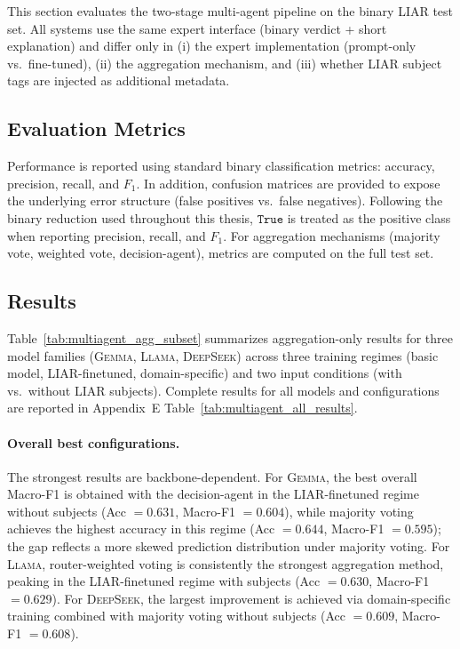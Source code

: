 This section evaluates the two-stage multi-agent pipeline on the binary LIAR test set.
All systems use the same expert interface (binary verdict + short explanation) and differ only in (i) the expert implementation (prompt-only vs.\ fine-tuned), (ii) the aggregation mechanism, and (iii) whether LIAR subject tags are injected as additional metadata.

\subsection{Evaluation Metrics}

Performance is reported using standard binary classification metrics: accuracy, precision, recall, and $F_1$.
In addition, confusion matrices are provided to expose the underlying error structure (false positives vs.\ false negatives).
Following the binary reduction used throughout this thesis, $\texttt{True}$ is treated as the positive class when reporting precision, recall, and $F_1$.
For aggregation mechanisms (majority vote, weighted vote, decision-agent), metrics are computed on the full test set.

\subsection{Results}

Table~\ref{tab:multiagent_agg_subset} summarizes aggregation-only results for three model families (\textsc{Gemma}, \textsc{Llama}, \textsc{DeepSeek}) across three training regimes (basic model, LIAR-finetuned, domain-specific) and two input conditions (with vs.\ without LIAR subjects). Complete results for all models and configurations are reported in Appendix~E Table~\ref{tab:multiagent_all_results}.

\paragraph{Overall best configurations.}
The strongest results are backbone-dependent.
For \textsc{Gemma}, the best overall Macro-F1 is obtained with the decision-agent in the LIAR-finetuned regime without subjects (Acc $=0.631$, Macro-F1 $=0.604$), while majority voting achieves the highest accuracy in this regime (Acc $=0.644$, Macro-F1 $=0.595$); the gap reflects a more skewed prediction distribution under majority voting.
For \textsc{Llama}, router-weighted voting is consistently the strongest aggregation method, peaking in the LIAR-finetuned regime with subjects (Acc $=0.630$, Macro-F1 $=0.629$).
For \textsc{DeepSeek}, the largest improvement is achieved via domain-specific training combined with majority voting without subjects (Acc $=0.609$, Macro-F1 $=0.608$).

